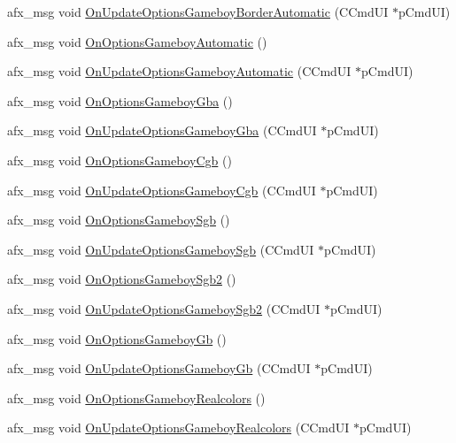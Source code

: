 \begin{DoxyCompactItemize}
afx\+\_\+msg void \mbox{\hyperlink{class_main_wnd_a7181010c8912d36e6921ef2bfd1adf59}{On\+Update\+Options\+Gameboy\+Border\+Automatic}} (C\+Cmd\+UI $\ast$p\+Cmd\+UI)
\item 
afx\+\_\+msg void \mbox{\hyperlink{class_main_wnd_ab3133ad26d9d8f243c32c3243e8b28d9}{On\+Options\+Gameboy\+Automatic}} ()
\item 
afx\+\_\+msg void \mbox{\hyperlink{class_main_wnd_abb2fc8aa13f0ac3379e8ce8ede02c8ad}{On\+Update\+Options\+Gameboy\+Automatic}} (C\+Cmd\+UI $\ast$p\+Cmd\+UI)
\item 
afx\+\_\+msg void \mbox{\hyperlink{class_main_wnd_abb13c622e7fb92ea067235276584d2ea}{On\+Options\+Gameboy\+Gba}} ()
\item 
afx\+\_\+msg void \mbox{\hyperlink{class_main_wnd_ac19dc2b23a6bc58bd372598025ebf82b}{On\+Update\+Options\+Gameboy\+Gba}} (C\+Cmd\+UI $\ast$p\+Cmd\+UI)
\item 
afx\+\_\+msg void \mbox{\hyperlink{class_main_wnd_a962d2f50647e403aff3939a87cbfbd83}{On\+Options\+Gameboy\+Cgb}} ()
\item 
afx\+\_\+msg void \mbox{\hyperlink{class_main_wnd_a981614dcd952edf9cc56bea10a776116}{On\+Update\+Options\+Gameboy\+Cgb}} (C\+Cmd\+UI $\ast$p\+Cmd\+UI)
\item 
afx\+\_\+msg void \mbox{\hyperlink{class_main_wnd_a8a68d6c4577e01b29a29860266c7ed07}{On\+Options\+Gameboy\+Sgb}} ()
\item 
afx\+\_\+msg void \mbox{\hyperlink{class_main_wnd_a7da1fc10502037d014524bac0bdea7c6}{On\+Update\+Options\+Gameboy\+Sgb}} (C\+Cmd\+UI $\ast$p\+Cmd\+UI)
\item 
afx\+\_\+msg void \mbox{\hyperlink{class_main_wnd_aabb11ee170b5116fb889995f168e6045}{On\+Options\+Gameboy\+Sgb2}} ()
\item 
afx\+\_\+msg void \mbox{\hyperlink{class_main_wnd_af4ff595c3cbb12ff64dd2f485472740c}{On\+Update\+Options\+Gameboy\+Sgb2}} (C\+Cmd\+UI $\ast$p\+Cmd\+UI)
\item 
afx\+\_\+msg void \mbox{\hyperlink{class_main_wnd_a0b2a5caeea62067bd152c9247a52c3fa}{On\+Options\+Gameboy\+Gb}} ()
\item 
afx\+\_\+msg void \mbox{\hyperlink{class_main_wnd_a5a439a63c75a38577924c18e6f8b7bf9}{On\+Update\+Options\+Gameboy\+Gb}} (C\+Cmd\+UI $\ast$p\+Cmd\+UI)
\item 
afx\+\_\+msg void \mbox{\hyperlink{class_main_wnd_a3c22c4fc314110e06499edd9028ad033}{On\+Options\+Gameboy\+Realcolors}} ()
\item 
afx\+\_\+msg void \mbox{\hyperlink{class_main_wnd_ae6d09f6d944ff25a57bfef8b23c77c0c}{On\+Update\+Options\+Gameboy\+Realcolors}} (C\+Cmd\+UI $\ast$p\+Cmd\+UI)

\end{DoxyCompactItemize}
